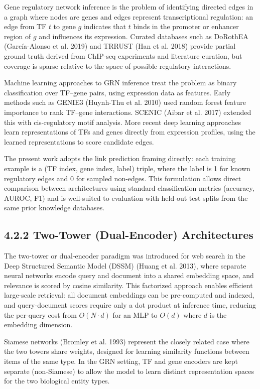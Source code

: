 \documentclass[
  12pt,
]{report}
\begin{document}
Gene regulatory network inference is the problem of identifying directed
edges in a graph where nodes are genes and edges represent
transcriptional regulation: an edge from TF \(t\) to gene \(g\)
indicates that \(t\) binds in the promoter or enhancer region of \(g\)
and influences its expression. Curated databases such as DoRothEA
(García-Alonso et al. 2019) and TRRUST ({Han et al.} 2018) provide
partial ground truth derived from ChIP-seq experiments and literature
curation, but coverage is sparse relative to the space of possible
regulatory interactions.

Machine learning approaches to GRN inference treat the problem as binary
classification over TF--gene pairs, using expression data as features.
Early methods such as GENIE3 (Huynh-Thu et al. 2010) used random forest
feature importance to rank TF--gene interactions. SCENIC ({Aibar et al.}
2017) extended this with cis-regulatory motif analysis. More recent deep
learning approaches learn representations of TFs and genes directly from
expression profiles, using the learned representations to score
candidate edges.

The present work adopts the link prediction framing directly: each
training example is a (TF index, gene index, label) triple, where the
label is 1 for known regulatory edges and 0 for sampled non-edges. This
formulation allows direct comparison between architectures using
standard classification metrics (accuracy, AUROC, F1) and is well-suited
to evaluation with held-out test splits from the same prior knowledge
databases.

\subsection{4.2.2 Two-Tower (Dual-Encoder)
Architectures}\label{two-tower-dual-encoder-architectures}

The two-tower or dual-encoder paradigm was introduced for web search in
the Deep Structured Semantic Model (DSSM) (Huang et al. 2013), where
separate neural networks encode query and document into a shared
embedding space, and relevance is scored by cosine similarity. This
factorized approach enables efficient large-scale retrieval: all
document embeddings can be pre-computed and indexed, and query-document
scores require only a dot product at inference time, reducing the
per-query cost from \(O(N \cdot d)\) for an MLP to \(O(d)\) where \(d\)
is the embedding dimension.

Siamese networks (Bromley et al. 1993) represent the closely related
case where the two towers share weights, designed for learning
similarity functions between items of the same type. In the GRN setting,
TF and gene encoders are kept separate (non-Siamese) to allow the model
to learn distinct representation spaces for the two biological entity
types.
\end{document}
